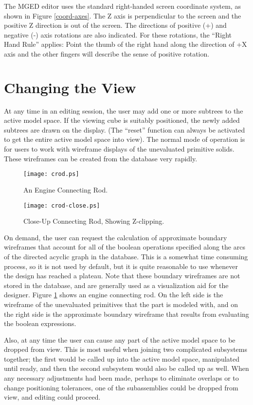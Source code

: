 The MGED editor uses the standard right-handed
screen coordinate system,
as shown in Figure \ref{coord-axes}.
The Z axis is perpendicular to the screen and the positive Z direction is
out of the screen.  The directions of positive (+) and negative (-) axis
rotations are also indicated.  For these rotations, the ``Right
Hand Rule'' applies:  Point the thumb of the right hand along the direction
of +X axis and the other fingers will describe the sense of positive
rotation.

\section{Changing the View}

At any time in an editing session, the user may add one or more
subtrees to the active model space.  If the viewing cube is
suitably positioned, the newly added subtrees are drawn on the display.
(The ``reset'' function can always be activated to get the entire active
model space into view).
The normal mode of operation is for users to work with wireframe
displays of the unevaluated primitive solids.  These wireframes can be
created from the database very rapidly.
\begin{figure}
\centering \texttt{[image: crod.ps]}
\caption{An Engine Connecting Rod.}
\label{crod}
\end{figure}

\begin{figure}
\centering \texttt{[image: crod-close.ps]}
\caption{Close-Up Connecting Rod, Showing Z-clipping.}
\label{crod-close}
\end{figure}

On demand, the user can request the calculation of
approximate boundary wireframes that account for
all of the boolean operations specified along the arcs of the
directed acyclic graph in the database.
This is a somewhat time consuming process, so it is not used
by default, but it is quite reasonable to use whenever the
design has reached a plateau.
Note that these boundary wireframes are not stored in the database,
and are generally used as a visualization aid for the designer.
Figure \ref{crod} shows an engine connecting rod.
On the left side is the wireframe of the unevaluated primitives
that the part is modeled with, and on the right side is the approximate
boundary wireframe that results from evaluating the boolean expressions.

Also, at any time the user can cause any part of the active model space
to be dropped from view.
This is most useful when joining two complicated subsystems
together;  the first would be called up into the active model space,
manipulated until ready, and then the second subsystem would also be
called up as well.  When any necessary adjustments had been made,
perhaps to eliminate overlaps or to change positioning tolerances,
one of the subassemblies could be dropped from view,
and editing could proceed.

